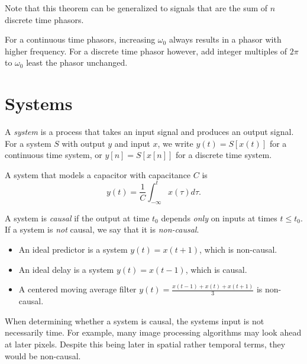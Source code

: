\documentclass[12pt]{article}
\begin{document}
\begin{rmk}
    Note that this theorem can be generalized to signals that are the sum of $n$ discrete time phasors.
\end{rmk}

\begin{rmk}
    For a continuous time phasors, increasing $\omega_0$ always results in a phasor with higher frequency. For a discrete time phasor however, add integer multiples of $2\pi$ to $\omega_0$ least the phasor unchanged.
\end{rmk}

\section{Systems}

A \emph{system} is a process that takes an input signal and produces an output signal. For a system $S$ with output $y$ and input $x$, we write $y(t) = S[x(t)]$ for a continuous time system, or $y[n] = S[x[n]]$ for a discrete time system.

\begin{exmp}
    A system that models a capacitor with capacitance $C$ is \[y(t) = \frac{1}{C}\int_{-\infty}^{t}x(\tau)d\tau.\]
\end{exmp}

\begin{defn}
    A system is \emph{causal} if the output at time $t_0$ depends \emph{only} on inputs at times $t \leq t_0$. If a system is \emph{not} causal, we say that it is \emph{non-causal}.
\end{defn}

\begin{exmp}\proofbreak
    \begin{itemize}
        \item An ideal predictor is a system $y(t) = x(t+1)$, which is non-causal.
        \item An ideal delay is a system $y(t) = x(t-1)$, which is causal.
        \item A centered moving average filter $y(t) = \frac{x(t-1) + x(t) + x(t+1)}{3}$ is non-causal.
    \end{itemize}
\end{exmp}

\begin{rmk}
    When determining whether a system is causal, the systems input is not necessarily time. For example, many image processing algorithms may look ahead at later pixels. Despite this being later in spatial rather temporal terms, they would be non-causal.
\end{rmk}
\end{document}
